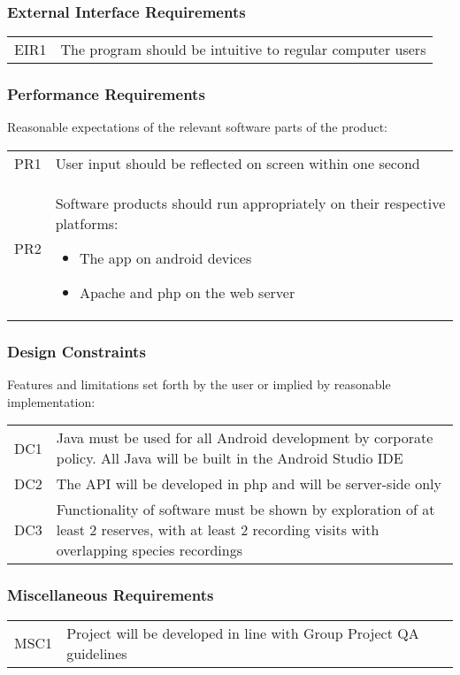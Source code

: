 \subsubsection{External Interface Requirements}
	\begin{tabular}{r | p{15cm}}
		EIR1 & The program should be intuitive to regular computer users \\
	\end{tabular}

\subsubsection{Performance Requirements}
	Reasonable expectations of the relevant software parts of the product: \\
	\begin{tabular}{r | p{15cm}}
		PR1 & User input should be reflected on screen within one second \\
		PR2 & Software products should run appropriately on their respective platforms:
		\begin{itemize}
			\item The app on android devices
			\item Apache and php on the web server
		\end{itemize}
	\end{tabular}

\subsubsection{Design Constraints}
	Features and limitations set forth by the user or implied by reasonable implementation: \\
	\begin{tabular}{r | p{15cm}}
		DC1 & Java must be used for all Android development by corporate policy. All Java will be built in the Android Studio IDE \\
		DC2 & The API will be developed in php and will be server-side only \\
		DC3 & Functionality of software must be shown by exploration of at least 2 reserves, with at least 2 recording visits with overlapping species recordings \\
	\end{tabular}

\subsubsection{Miscellaneous Requirements}
	\begin{tabular}{r | p{15cm}}
		MSC1 & Project will be developed in line with Group Project QA guidelines \\
	\end{tabular}

